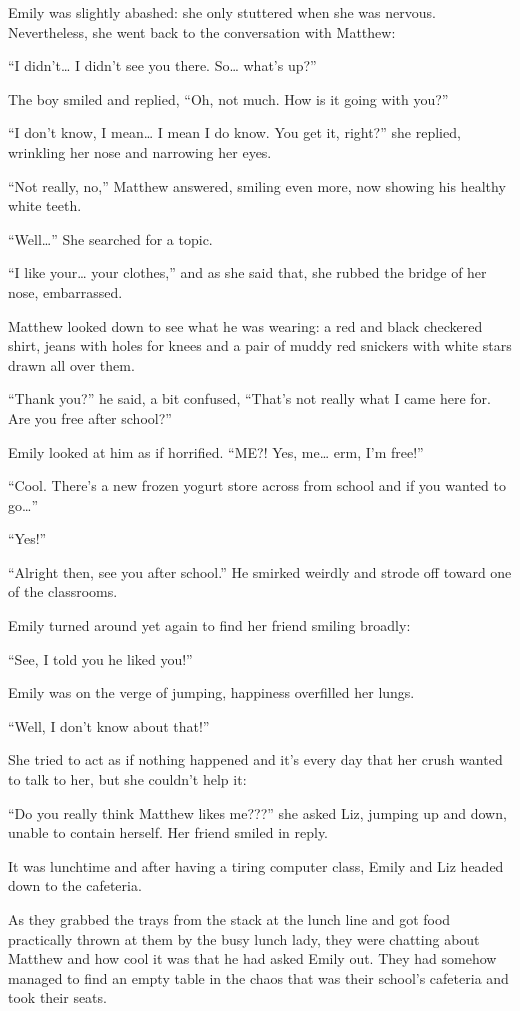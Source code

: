 Emily was slightly abashed: she only stuttered when she was nervous. Nevertheless, she went back to the conversation with Matthew:

“I didn't… I didn't see you there. So… what's up?”

The boy smiled and replied, “Oh, not much. How is it going with you?”

“I don't know, I mean… I mean I do know. You get it, right?” she replied, wrinkling her nose and narrowing her eyes.

“Not really, no,” Matthew answered, smiling even more, now showing his healthy white teeth.

“Well…” She searched for a topic.

“I like your… your clothes,” and as she said that, she rubbed the bridge of her nose, embarrassed.

Matthew looked down to see what he was wearing: a red and black checkered shirt, jeans with holes for knees and a pair of muddy red snickers with white stars drawn all over them.

“Thank you?” he said, a bit confused, “That's not really what I came here for. Are you free after school?”

Emily looked at him as if horrified. “ME?! Yes, me… erm, I'm free!”

“Cool. There's a new frozen yogurt store across from school and if you wanted to go…”

“Yes!”

“Alright then, see you after school.” He smirked weirdly and strode off toward one of the classrooms.

Emily turned around yet again to find her friend smiling broadly:

“See, I told you he liked you!”

Emily was on the verge of jumping, happiness overfilled her lungs.

“Well, I don't know about that!”

She tried to act as if nothing happened and it's every day that her crush wanted to talk to her, but she couldn't help it:

“Do you really think Matthew likes me???” she asked Liz, jumping up and down, unable to contain herself. Her friend smiled in reply.

\bigskip

It was lunchtime and after having a tiring computer class, Emily and Liz headed down to the cafeteria.

As they grabbed the trays from the stack at the lunch line and got food practically thrown at them by the busy lunch lady, they were chatting about Matthew and how cool it was that he had asked Emily out.
They had somehow managed to find an empty table in the chaos that was their school's cafeteria and took their seats.

